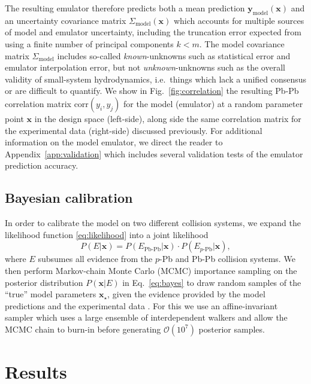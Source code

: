\documentclass[aps,prc,reprint,amsmath,nofootinbib]{revtex4-1}
\newcommand{\xv}{\mathbf x}
\newcommand{\ym}{{\mathbf y}_\text{model}}
\newcommand{\Sigmam}{\Sigma_\text{model}}
\newcommand{\order}[1]{$\mathcal O(10^{#1})$}
\begin{document}
The resulting emulator therefore predicts both a mean prediction $\ym(\xv)$ and an uncertainty covariance matrix $\Sigmam(\xv)$ which accounts for multiple sources of model and emulator uncertainty, including the truncation error expected from using a finite number of principal components $k < m$.
The model covariance matrix $\Sigmam$ includes so-called \emph{known}-unknowns such as statistical error and emulator interpolation error, but not \emph{unknown}-unknowns such as the overall validity of small-system hydrodynamics, i.e.\ things which lack a unified consensus or are difficult to quantify.
We show in Fig.~\ref{fig:correlation} the resulting Pb-Pb correlation matrix $\mathrm{corr}(y_i,y_j)$ for the model (emulator) at a random parameter point $\xv$ in the design space (left-side), along side the same correlation matrix for the experimental data (right-side) discussed previously.
For additional information on the model emulator, we direct the reader to Appendix~\ref{app:validation} which includes several validation tests of the emulator prediction accuracy.

\subsection{Bayesian calibration}

In order to calibrate the model on two different collision systems, we expand the likelihood function \eqref{eq:likelihood} into a joint likelihood
\begin{equation}
  \label{eq:joint_likelihood}
  P(E | \xv) = P(E_\text{Pb-Pb} | \xv) \cdot P(E_\text{$p$-Pb} | \xv),
\end{equation}
where $E$ subsumes all evidence from the $p$-Pb and \mbox{Pb-Pb} collision systems.
We then perform Markov-chain Monte Carlo (MCMC) importance sampling on the posterior distribution $P(\xv | E)$ in Eq.~\eqref{eq:bayes} to draw random samples of the ``true'' model parameters $\xv_\star$, given the evidence provided by the model predictions and the experimental data \cite{Goodman:2010en, FM:2013mc}.
For this we use an affine-invariant sampler which uses a large ensemble of interdependent walkers \cite{Goodman:2010en, FM:2013mc} and allow the MCMC chain to burn-in before generating \order{7} posterior samples.

\section{Results}
\label{sec:results}
\end{document}
